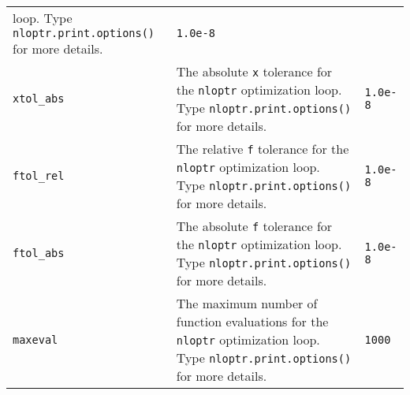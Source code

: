 \documentclass[article]{jss}
\begin{document}
\begin{longtable}[]{@{}lll@{}}
\begin{minipage}[t]{0.61\columnwidth}
loop. Type \texttt{nloptr.print.options()} for more details.\strut
\end{minipage} & \begin{minipage}[t]{0.12\columnwidth}\raggedright
\texttt{1.0e-8}\strut
\end{minipage}\tabularnewline
\begin{minipage}[t]{0.18\columnwidth}\raggedright
\texttt{xtol\_abs}\strut
\end{minipage} & \begin{minipage}[t]{0.61\columnwidth}\raggedright
The absolute \texttt{x} tolerance for the \texttt{nloptr} optimization
loop. Type \texttt{nloptr.print.options()} for more details.\strut
\end{minipage} & \begin{minipage}[t]{0.12\columnwidth}\raggedright
\texttt{1.0e-8}\strut
\end{minipage}\tabularnewline
\begin{minipage}[t]{0.18\columnwidth}\raggedright
\texttt{ftol\_rel}\strut
\end{minipage} & \begin{minipage}[t]{0.61\columnwidth}\raggedright
The relative \texttt{f} tolerance for the \texttt{nloptr} optimization
loop. Type \texttt{nloptr.print.options()} for more details.\strut
\end{minipage} & \begin{minipage}[t]{0.12\columnwidth}\raggedright
\texttt{1.0e-8}\strut
\end{minipage}\tabularnewline
\begin{minipage}[t]{0.18\columnwidth}\raggedright
\texttt{ftol\_abs}\strut
\end{minipage} & \begin{minipage}[t]{0.61\columnwidth}\raggedright
The absolute \texttt{f} tolerance for the \texttt{nloptr} optimization
loop. Type \texttt{nloptr.print.options()} for more details.\strut
\end{minipage} & \begin{minipage}[t]{0.12\columnwidth}\raggedright
\texttt{1.0e-8}\strut
\end{minipage}\tabularnewline
\begin{minipage}[t]{0.18\columnwidth}\raggedright
\texttt{maxeval}\strut
\end{minipage} & \begin{minipage}[t]{0.61\columnwidth}\raggedright
The maximum number of function evaluations for the \texttt{nloptr}
optimization loop. Type \texttt{nloptr.print.options()} for more
details.\strut
\end{minipage} & \begin{minipage}[t]{0.12\columnwidth}\raggedright
\texttt{1000}\strut
\end{minipage}\tabularnewline
\bottomrule
\end{longtable}
\end{document}
